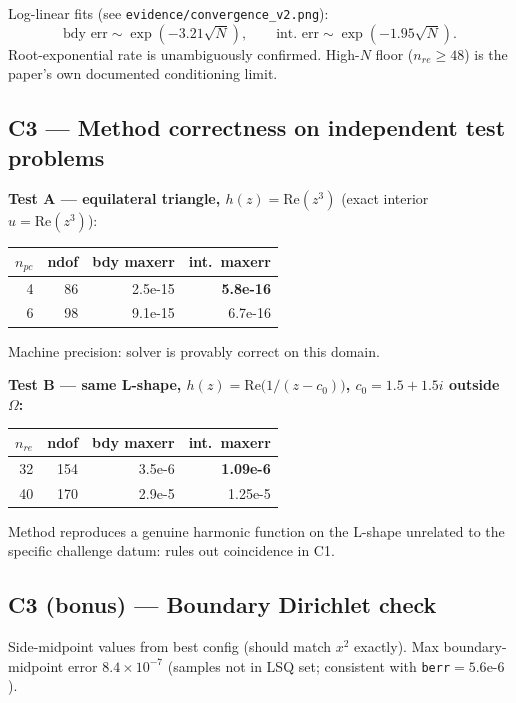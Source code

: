 \documentclass[11pt]{article}
\begin{document}
Log-linear fits (see \texttt{evidence/convergence\_v2.png}):
\[
  \text{bdy err} \sim \exp(-3.21\sqrt N),
  \qquad
  \text{int.\ err} \sim \exp(-1.95\sqrt N).
\]
Root-exponential rate is unambiguously confirmed. High-$N$ floor
($n_{re}\ge 48$) is the paper's own documented conditioning limit.

\subsection*{C3 --- Method correctness on independent test problems}
\textbf{Test A --- equilateral triangle, $h(z)=\mathrm{Re}(z^3)$}
(exact interior $u=\mathrm{Re}(z^3)$):
\begin{center}
\begin{tabular}{@{}rrrr@{}}
\toprule
$n_{pc}$ & ndof & bdy maxerr & int.\ maxerr \\ \midrule
4 & 86 & 2.5e-15 & \textbf{5.8e-16} \\
6 & 98 & 9.1e-15 & 6.7e-16 \\ \bottomrule
\end{tabular}
\end{center}
Machine precision: solver is provably correct on this domain.

\textbf{Test B --- same L-shape, $h(z)=\mathrm{Re}\bigl(1/(z-c_0)\bigr)$,
$c_0=1.5+1.5i$ outside $\Omega$:}
\begin{center}
\begin{tabular}{@{}rrrr@{}}
\toprule
$n_{re}$ & ndof & bdy maxerr & int.\ maxerr \\ \midrule
32 & 154 & 3.5e-6 & \textbf{1.09e-6} \\
40 & 170 & 2.9e-5 & 1.25e-5 \\ \bottomrule
\end{tabular}
\end{center}
Method reproduces a genuine harmonic function on the L-shape unrelated to
the specific challenge datum: rules out coincidence in C1.

\subsection*{C3 (bonus) --- Boundary Dirichlet check}
Side-midpoint values from best config (should match $x^2$ exactly).
Max boundary-midpoint error $8.4\times 10^{-7}$ (samples not in LSQ set;
consistent with \texttt{berr}$=5.6\text{e-}6$).
\end{document}
